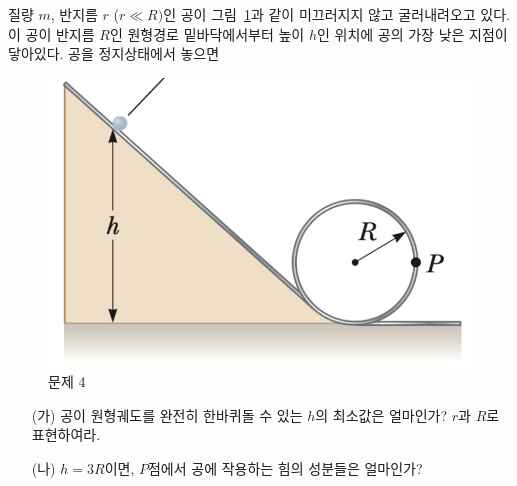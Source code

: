 \documentclass[floatfix,nofootinbib,superscriptaddress,fleqn]{revtex4-2}
\begin{document}
\vspace{1.cm}

질량 $m$, 반지름 $r$ ($r\ll R)$인 공이 그림~\ref{fig:4}과 같이
미끄러지지 않고 굴러내려오고 있다. 이 공이 반지름 $R$인 원형경로
밑바닥에서부터 높이 $h$인 위치에 공의 가장 낮은 지점이 닿아있다. 공을
정지상태에서 놓으면
\begin{figure}[htp]
  \centering
\includegraphics[scale=0.6]{Qfig12-1.pdf}  
  \caption{문제 4}
  \label{fig:4}
\end{figure}
\begin{itemize}
\item[(가)] 공이 원형궤도를 완전히 한바퀴돌 수 있는 $h$의 최소값은
  얼마인가? $r$과 $R$로 표현하여라.
\item[(나)] $h=3R$이면, $P$점에서 공에 작용하는 힘의 성분들은
  얼마인가?   
\end{itemize}
\end{document}
